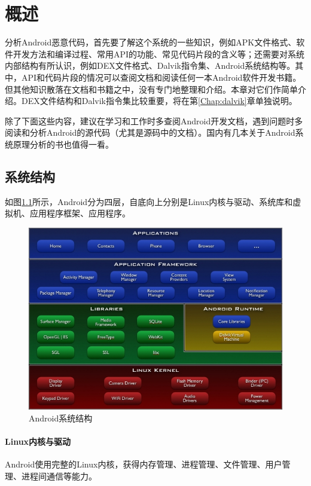 \chapter{概述}
分析Android恶意代码，首先要了解这个系统的一些知识，例如APK文件格式、软件开发方法和编译过程、常用API的功能、常见代码片段的含义等；还需要对系统内部结构有所认识，例如DEX文件格式、Dalvik指令集、Android系统结构等。其中，API和代码片段的情况可以查阅文档和阅读任何一本Android软件开发书籍。但其他知识散落在文档和书籍之中，没有专门地整理和介绍。本章对它们作简单介绍。DEX文件结构和Dalvik指令集比较重要，将在第\ref{Chap:dalvik}章单独说明。

除了下面这些内容，建议在学习和工作时多查阅Android开发文档，遇到问题时多阅读和分析Android的源代码（尤其是源码中的文档）。国内有几本关于Android系统原理分析的书\cite{android_jishuneimu, android_shenrulijie, android_neihepouxi}也值得一看。

\section{系统结构}
如图\ref{Fig:system-architecture}所示，Android分为四层，自底向上分别是Linux内核与驱动、系统库和虚拟机、应用程序框架、应用程序。
\begin{figure}[htbp]
  \centering
  \includegraphics[width=14cm]{image/system-architecture.jpg}
  \caption{Android系统结构}
  \label{Fig:system-architecture}
\end{figure}

\subsubsection{Linux内核与驱动}
Android使用完整的Linux内核，获得内存管理、进程管理、文件管理、用户管理、进程间通信等能力。

